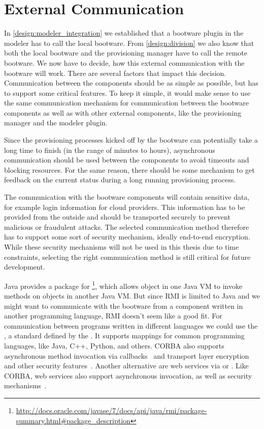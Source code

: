 \section{External Communication}
\label{design:communication}

In \autoref{design:modeler_integration} we established that a bootware plugin in the modeler has to call the local bootware.
From \autoref{design:division} we also know that both the local bootware and the provisioning manager have to call the remote bootware.
We now have to decide, how this external communication with the bootware will work.
There are several factors that impact this decision.
Communication between the components should be as simple as possible, but has to support some critical features.
To keep it simple, it would make sense to use the same communication mechanism for communication between the bootware components as well as with other external components, like the provisioning manager and the modeler plugin.

Since the provisioning processes kicked off by the bootware can potentially take a long time to finish (in the range of minutes to hours), asynchronous communication should be used between the components to avoid timeouts and blocking resources.
For the same reason, there should be some mechanism to get feedback on the current status during a long running provisioning process.

The communication with the bootware components will contain sensitive data, for example login information for cloud providers.
This information has to be provided from the outside and should be transported securely to prevent malicious or fraudulent attacks.
The selected communication method therefore has to support some sort of security mechanism, ideally end-to-end encryption.
While these security mechanisms will not be used in this thesis due to time constraints, selecting the right communication method is still critical for future development.

Java provides a package for \footnote{\url{http://docs.oracle.com/javase/7/docs/api/java/rmi/package-summary.html\#package_description}}, which allows object in one Java VM to invoke methods on objects in another Java VM.
But since RMI is limited to Java and we might want to communicate with the bootware from a component written in another programming language, RMI doesn't seem like a good fit.
For communication between programs written in different languages we could use the , a standard defined by the .
It supports mappings for common programming languages, like Java, C++, Python, and others.
CORBA also supports asynchronous method invocation via callbacks~\autocite{corba:async} and transport layer encryption and other security features~\autocite{corba:security}.
Another alternative are web services via  or .
Like CORBA, web services also support asynchronous invocation, as well as security mechanisms~\autocite{ws:security}.

